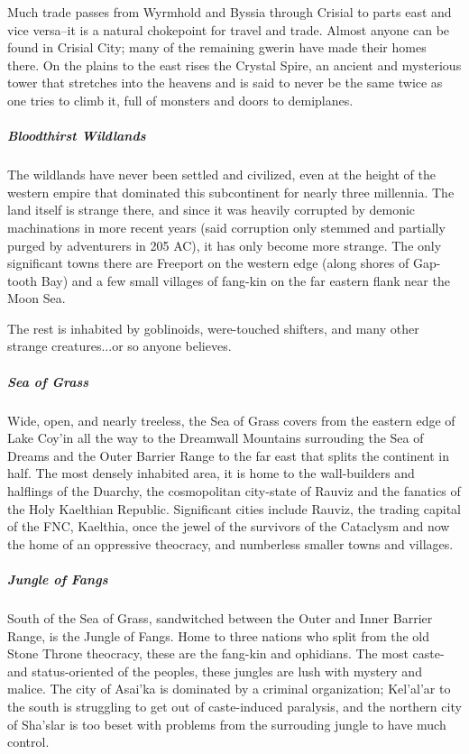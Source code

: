 Much trade passes from Wyrmhold and Byssia through Crisial to parts east and vice versa--it is a natural chokepoint for travel and trade. Almost anyone can be found in Crisial City; many of the remaining gwerin have made their homes there. On the plains to the east rises the Crystal Spire, an ancient and mysterious tower that stretches into the heavens and is said to never be the same twice as one tries to climb it, full of monsters and doors to demiplanes.

\subparagraph*{Bloodthirst Wildlands} The wildlands have never been settled and civilized, even at the height of the western empire that dominated this subcontinent for nearly three millennia. The land itself is strange there, and since it was heavily corrupted by demonic machinations in more recent years (said corruption only stemmed and partially purged by adventurers in 205 AC), it has only become more strange. The only significant towns there are Freeport on the western edge (along shores of Gap-tooth Bay) and a few small villages of fang-kin on the far eastern flank near the Moon Sea.

The rest is inhabited by goblinoids, were-touched shifters, and many other strange creatures...or so anyone believes.

\subparagraph*{Sea of Grass} Wide, open, and nearly treeless, the Sea of Grass covers from the eastern edge of Lake Coy'in all the way to the Dreamwall Mountains surrouding the Sea of Dreams and the Outer Barrier Range to the far east that splits the continent in half. The most densely inhabited area, it is home to the wall-builders and halflings of the Duarchy, the cosmopolitan city-state of Rauviz and the fanatics of the Holy Kaelthian Republic. Significant cities include Rauviz, the trading capital of the FNC, Kaelthia, once the jewel of the survivors of the Cataclysm and now the home of an oppressive theocracy, and numberless smaller towns and villages.

\subparagraph*{Jungle of Fangs} South of the Sea of Grass, sandwitched between the Outer and Inner Barrier Range, is the Jungle of Fangs. Home to three nations who split from the old Stone Throne theocracy, these are the fang-kin and ophidians. The most caste- and status-oriented of the peoples, these jungles are lush with mystery and malice. The city of Asai'ka is dominated by a criminal organization; Kel'al'ar to the south is struggling to get out of caste-induced paralysis, and the northern city of Sha'slar is too beset with problems from the surrouding jungle to have much control.

